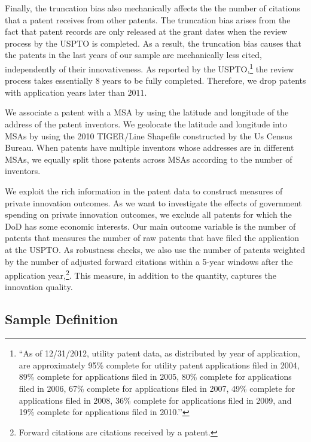 \documentclass[dv_diss_main.tex]{subfiles}
\begin{document}
Finally, the truncation bias also mechanically affects the the number of citations that a patent receives from other patents. The truncation bias arises from the fact that patent records are only released at the grant dates when the review process by the USPTO is completed. As a result, the truncation bias causes that the patents in the last years of our sample are mechanically less cited, independently of their innovativeness. As reported by the USPTO,\footnote{``As of 12/31/2012, utility patent data, as distributed by year of application, are approximately 95\% complete for utility patent applications filed in 2004, 89\% complete for applications filed in 2005, 80\% complete for applications filed in 2006, 67\% complete for applications filed in 2007, 49\% complete for applications filed in 2008, 36\% complete for applications filed in 2009, and 19\% complete for applications filed in 2010.’’} the review process takes essentially $8$ years to be fully completed. Therefore, we drop patents with application years later than $2011$. 

We associate a patent with a MSA by using the latitude and longitude of the address of the patent inventors. We geolocate the latitude and longitude into MSAs by using the 2010 TIGER/Line Shapefile constructed by the Us Census Bureau. When patents have multiple inventors whose addresses are in different MSAs, we equally split those patents across MSAs according to the number of inventors. 

We exploit the rich information in the patent data to construct measures of private innovation outcomes. As we want to investigate the effects of government spending on private innovation outcomes, we exclude all patents for which the DoD has some economic interests. Our main outcome variable is the number of patents that measures the number of raw patents that have filed the application at the USPTO. As robustness checks, we also use the number of patents weighted by the number of adjusted forward citations within a 5-year windows after the application year,\footnote{Forward citations are citations received by a patent.}. This measure, in addition to the quantity, captures the innovation quality. 
\fi 










\subsection{Sample Definition}
\label{subsec:data_sam}
\end{document}
